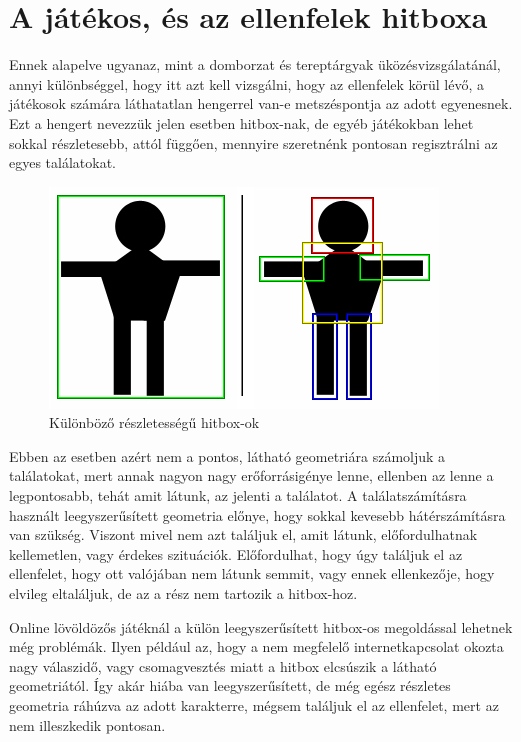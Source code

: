 \section{A játékos, és az ellenfelek hitboxa}


Ennek alapelve ugyanaz, mint a domborzat és tereptárgyak üközésvizsgálatánál, annyi különbséggel, hogy itt azt kell vizsgálni, hogy az ellenfelek körül lévő, a játékosok számára láthatatlan hengerrel van-e metszéspontja az adott egyenesnek. Ezt a hengert nevezzük jelen esetben hitbox-nak, de egyéb játékokban lehet sokkal részletesebb, attól függően, mennyire szeretnénk pontosan regisztrálni az egyes találatokat.

\begin{figure}[h]
\centering
\includegraphics[scale=0.3]{kepek/hitbox.png}
\caption{Különböző részletességű hitbox-ok}
\label{fig:hitbox}
\end{figure}

Ebben az esetben azért nem a pontos, látható geometriára számoljuk a találatokat, mert annak nagyon nagy erőforrásigénye lenne, ellenben az lenne a legpontosabb, tehát amit látunk, az jelenti a találatot. A találatszámításra használt leegyszerűsített geometria előnye, hogy sokkal kevesebb hátérszámításra van szükség. Viszont mivel nem azt találjuk el, amit látunk, előfordulhatnak kellemetlen, vagy érdekes szituációk. Előfordulhat, hogy úgy találjuk el az ellenfelet, hogy ott valójában nem látunk semmit, vagy ennek ellenkezője, hogy elvileg eltaláljuk, de az a rész nem tartozik a hitbox-hoz.

Online lövöldözős játéknál a külön leegyszerűsített hitbox-os megoldással lehetnek még problémák. Ilyen például az, hogy a nem megfelelő internetkapcsolat okozta nagy válaszidő, vagy csomagvesztés miatt a hitbox elcsúszik a látható geometriától. Így akár hiába van leegyszerűsített, de még egész részletes geometria ráhúzva az adott karakterre, mégsem találjuk el az ellenfelet, mert az nem illeszkedik pontosan.

